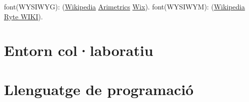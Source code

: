 font(WYSIWYG): (\href{https://es.wikipedia.org/wiki/WYSIWYG}{Wikipedia} \href{https://es.wikipedia.org/wiki/WYSIWYG}{Arimetrics} \href{https://www.wix.com/encyclopedia/definition/wysiwyg}{Wix}).
font(WYSIWYM): (\href{https://en.wikipedia.org/wiki/WYSIWYM}{Wikipedia} \href{https://en.ryte.com/wiki/WYSIWYG/}{Ryte WIKI}).

\section{Entorn col·laboratiu}\label{4.3}
\section{Llenguatge de programació}\label{4.4}

